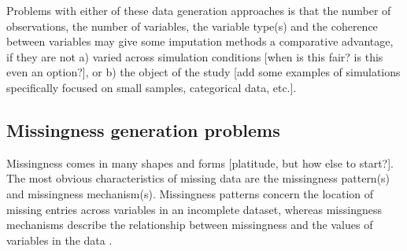 \documentclass[bimj,fleqn]{w-art}
\theoremstyle{plain}
\theoremstyle{definition}
\begin{document}
Problems with either of these data generation approaches is that the number of observations, the number of variables, the variable type(s) and the coherence between variables may give some imputation methods a comparative advantage, if they are not a) varied across simulation conditions [when is this fair? is this even an option?], or b) the object of the study [add some examples of simulations specifically focused on small samples, categorical data, etc.].


\subsection{Missingness generation problems}

Missingness comes in many shapes and forms [platitude, but how else to start?]. The most obvious characteristics of missing data are the missingness pattern(s) and missingness mechanism(s). Missingness patterns concern the location of missing entries across variables in an incomplete dataset, whereas missingness mechanisms describe the relationship between missingness and the values of variables in the data \citep[][p. 8]{litt20}.

\end{document}
